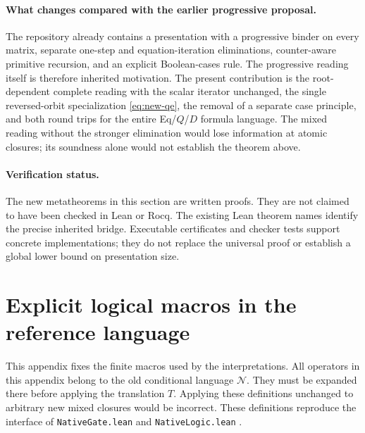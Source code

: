 \documentclass[11pt,a4paper]{article}
\theoremstyle{definition}\newtheorem{definition}[theorem]{Definition}
\begin{document}
\paragraph{What changes compared with the earlier progressive proposal.}
The repository already contains a presentation with a progressive binder
on every matrix, separate one-step and equation-iteration eliminations,
counter-aware primitive recursion, and an explicit Boolean-cases rule.\cite{progressive}
The progressive reading itself is therefore inherited motivation.  The
present contribution is the root-dependent complete reading with the scalar
iterator unchanged, the single reversed-orbit specialization
\eqref{eq:new-qe}, the removal of a separate case principle, and both
round trips for the entire Eq/$Q$/$D$ formula language.  The mixed reading
without the stronger elimination would lose information at atomic closures;
its soundness alone would not establish the theorem above.

\paragraph{Verification status.}
The new metatheorems in this section are written proofs.  They are not claimed
to have been checked in Lean or Rocq.  The existing Lean theorem names identify
the precise inherited bridge.  Executable certificates and checker tests
support concrete implementations; they do not replace the universal proof
or establish a global lower bound on presentation size.



\section{Explicit logical macros in the reference language}
\label{app:old-macros}

This appendix fixes the finite macros used by the interpretations. All
operators in this appendix belong to the old conditional language
$\mathcal N$. They must be expanded there before applying the translation
$T$. Applying these definitions unchanged to arbitrary new mixed
closures would be incorrect. These definitions reproduce the interface
of \texttt{NativeGate.lean} and \texttt{NativeLogic.lean}
\cite{native}.
\end{document}
